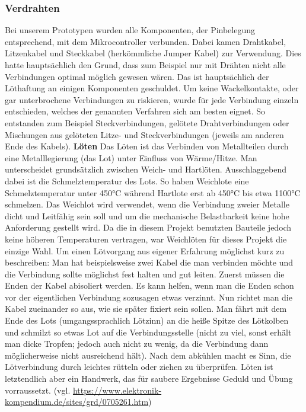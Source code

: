 \documentclass[11pt, twoside]{article}
\begin{document}
\subsubsection{Verdrahten}
Bei unserem Prototypen wurden alle Komponenten, der Pinbelegung entsprechend, mit dem Mikrocontroller verbunden. Dabei kamen Drahtkabel, Litzenkabel und Steckkabel (herkömmliche Jumper Kabel) zur Verwendung. Dies hatte hauptsächlich den Grund, dass zum Beispiel nur mit Drähten nicht alle Verbindungen optimal möglich gewesen wären. Das ist hauptsächlich der Löthaftung an einigen Komponenten geschuldet. Um keine Wackelkontakte, oder gar unterbrochene Verbindungen zu riskieren, wurde für jede Verbindung einzeln entschieden, welches der genannten Verfahren sich am besten eignet. So entstanden zum Beispiel Steckverbindungen, gelötete Drahtverbindungen oder Mischungen aus gelöteten Litze- und Steckverbindungen (jeweils am anderen Ende des Kabels).
\vspace{4mm}\newline
\textbf{Löten}\newline
\glqq Das Löten ist das Verbinden von Metallteilen durch eine Metalllegierung (das Lot) unter Einfluss von Wärme/Hitze.\grqq{} \newline
Man unterscheidet grundsätzlich zwischen Weich- und Hartlöten. Ausschlaggebend dabei ist die Schmelztemperatur des Lots. So haben Weichlote eine Schmelztemperatur unter 450°C während Hartlote erst ab 450°C bis etwa 1100°C schmelzen. \glqq Das Weichlot wird verwendet, wenn die Verbindung zweier Metalle dicht und Leitfähig sein soll und um die mechanische Belastbarkeit keine hohe Anforderung gestellt wird. \grqq{} Da die in diesem Projekt benutzten Bauteile jedoch keine höheren Temperaturen vertragen, war Weichlöten für dieses Projekt die einzige Wahl. \newline
Um einen Lötvorgang aus eigener Erfahrung möglichst kurz zu beschreiben:\newline
Man hat beispielsweise zwei Kabel die man verbinden möchte und die Verbindung sollte möglichst fest halten und gut leiten. Zuerst müssen die Enden der Kabel abisoliert werden. Es kann helfen, wenn man die Enden schon vor der eigentlichen Verbindung sozusagen etwas \glqq verzinnt\grqq{}. Nun richtet man die Kabel zueinander so aus, wie sie später fixiert sein sollen. Man fährt mit dem Ende des Lots (umgangssprachlich Lötzinn) an die heiße Spitze des Lötkolben und schmilzt so etwas Lot auf die Verbindungsstelle (nicht zu viel, sonst erhält man dicke Tropfen; jedoch auch nicht zu wenig, da die Verbindung dann möglicherweise nicht ausreichend hält). Nach dem abkühlen macht es Sinn, die Lötverbindung durch leichtes rütteln oder ziehen zu überprüfen. Löten ist letztendlich aber ein Handwerk, das für saubere Ergebnisse Geduld und Übung vorraussetzt.
\vspace{4mm}\newline
(vgl. \url{https://www.elektronik-kompendium.de/sites/grd/0705261.htm})
\end{document}
